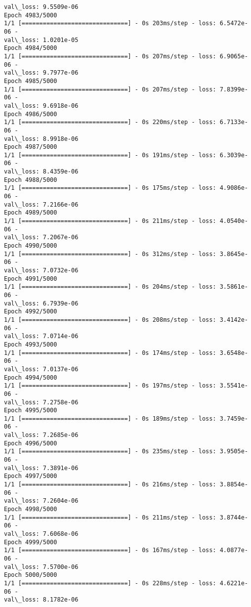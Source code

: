 \documentclass[11pt]{article}
\begin{document}
\begin{Verbatim}[commandchars=\\\{\}]
val\_loss: 9.5509e-06
Epoch 4983/5000
1/1 [==============================] - 0s 203ms/step - loss: 6.5472e-06 -
val\_loss: 1.0201e-05
Epoch 4984/5000
1/1 [==============================] - 0s 207ms/step - loss: 6.9065e-06 -
val\_loss: 9.7977e-06
Epoch 4985/5000
1/1 [==============================] - 0s 207ms/step - loss: 7.8399e-06 -
val\_loss: 9.6918e-06
Epoch 4986/5000
1/1 [==============================] - 0s 220ms/step - loss: 6.7133e-06 -
val\_loss: 8.9918e-06
Epoch 4987/5000
1/1 [==============================] - 0s 191ms/step - loss: 6.3039e-06 -
val\_loss: 8.4359e-06
Epoch 4988/5000
1/1 [==============================] - 0s 175ms/step - loss: 4.9086e-06 -
val\_loss: 7.2166e-06
Epoch 4989/5000
1/1 [==============================] - 0s 211ms/step - loss: 4.0540e-06 -
val\_loss: 7.2067e-06
Epoch 4990/5000
1/1 [==============================] - 0s 312ms/step - loss: 3.8645e-06 -
val\_loss: 7.0732e-06
Epoch 4991/5000
1/1 [==============================] - 0s 204ms/step - loss: 3.5861e-06 -
val\_loss: 6.7939e-06
Epoch 4992/5000
1/1 [==============================] - 0s 208ms/step - loss: 3.4142e-06 -
val\_loss: 7.0714e-06
Epoch 4993/5000
1/1 [==============================] - 0s 174ms/step - loss: 3.6548e-06 -
val\_loss: 7.0137e-06
Epoch 4994/5000
1/1 [==============================] - 0s 197ms/step - loss: 3.5541e-06 -
val\_loss: 7.2758e-06
Epoch 4995/5000
1/1 [==============================] - 0s 189ms/step - loss: 3.7459e-06 -
val\_loss: 7.2685e-06
Epoch 4996/5000
1/1 [==============================] - 0s 235ms/step - loss: 3.9505e-06 -
val\_loss: 7.3891e-06
Epoch 4997/5000
1/1 [==============================] - 0s 216ms/step - loss: 3.8854e-06 -
val\_loss: 7.2604e-06
Epoch 4998/5000
1/1 [==============================] - 0s 211ms/step - loss: 3.8744e-06 -
val\_loss: 7.6068e-06
Epoch 4999/5000
1/1 [==============================] - 0s 167ms/step - loss: 4.0877e-06 -
val\_loss: 7.5700e-06
Epoch 5000/5000
1/1 [==============================] - 0s 228ms/step - loss: 4.6221e-06 -
val\_loss: 8.1782e-06
    \end{Verbatim}


    
    
    
\end{document}
